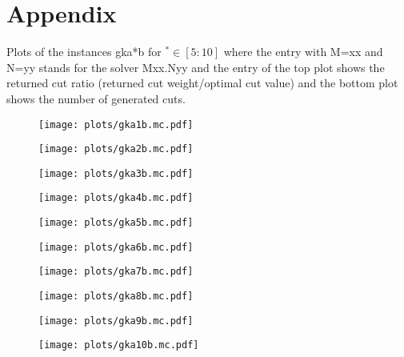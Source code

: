 \documentclass[12pt,a4paper]{article}
\theoremstyle{mythm}
\begin{document}
\appendix
\section{Appendix} 
Plots of the instances gka*b for $ ^{ * } \in \left[ 5:10 \right]   $ where the entry with M=xx and N=yy stands for the solver Mxx.Nyy and the entry of the top plot
shows the returned cut ratio (returned cut weight/optimal cut value) and the bottom plot shows the number of generated cuts.
\begin{figure}
\texttt{[image: plots/gka1b.mc.pdf]}
\end{figure} 
\begin{figure}
\texttt{[image: plots/gka2b.mc.pdf]}
\end{figure} 
\begin{figure}
\texttt{[image: plots/gka3b.mc.pdf]}
\end{figure} 
\begin{figure}
\texttt{[image: plots/gka4b.mc.pdf]}
\end{figure} 
\begin{figure}
\texttt{[image: plots/gka5b.mc.pdf]}
\end{figure} 
\begin{figure}
\texttt{[image: plots/gka6b.mc.pdf]}
\end{figure} 
\begin{figure}
\texttt{[image: plots/gka7b.mc.pdf]}
\end{figure} 
\begin{figure}
\texttt{[image: plots/gka8b.mc.pdf]}
\end{figure} 
\begin{figure}
\texttt{[image: plots/gka9b.mc.pdf]}
\end{figure} 
\begin{figure}
\texttt{[image: plots/gka10b.mc.pdf]}
\end{figure} 

%


\listoftodos[Notes]
\end{document}
